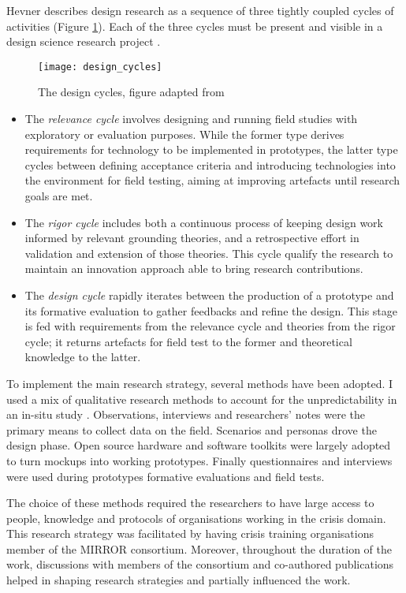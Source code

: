 Hevner \autocites{Havner2004}{hevner2007three} describes design research as a sequence of three tightly coupled cycles of activities (Figure \ref{fig:design-cycles}). Each of the three cycles must be present and visible in a design science research project \autocite{Hevner:2010gc}.
\begin{figure}
	[tbh] \centering 
	\texttt{[image: design\_cycles]} \caption{The design cycles, figure adapted from \protect\autocite{hevner2007three}} \label{fig:design-cycles} 
\end{figure}
\begin{itemize}
	\item The \emph{relevance cycle} involves designing and running field studies with exploratory or evaluation purposes. While the former type derives requirements for technology to be implemented in prototypes, the latter type cycles between defining acceptance criteria and introducing technologies into the environment for field testing, aiming at improving artefacts until research goals are met. 
	\item The \emph{rigor cycle} includes both a continuous process of keeping design work informed by relevant grounding theories, and a retrospective effort in validation and extension of those theories. This cycle qualify the research to maintain an innovation approach able to bring research contributions. 
	\item The \emph{design cycle} rapidly iterates between the production of a prototype and its formative evaluation to gather feedbacks and refine the design. This stage is fed with requirements from the relevance cycle and theories from the rigor cycle; it returns artefacts for field test to the former and theoretical knowledge to the latter. 
\end{itemize}

To implement the main research strategy, several methods have been adopted. I used a mix of qualitative research methods to account for the unpredictability in an in-situ study \autocite{Rogers:2007gv}. Observations, interviews and researchers' notes were the primary means to collect data on the field. Scenarios and personas drove the design phase. Open source hardware and software toolkits were largely adopted to turn mockups into working prototypes. Finally questionnaires and interviews were used during prototypes formative evaluations and field tests.

The choice of these methods required the researchers to have large access to people, knowledge and protocols of organisations working in the crisis domain. This research strategy was facilitated by having crisis training organisations member of the MIRROR consortium. Moreover, throughout the duration of the work, discussions with members of the consortium and co-authored publications helped in shaping research strategies and partially influenced the work.

